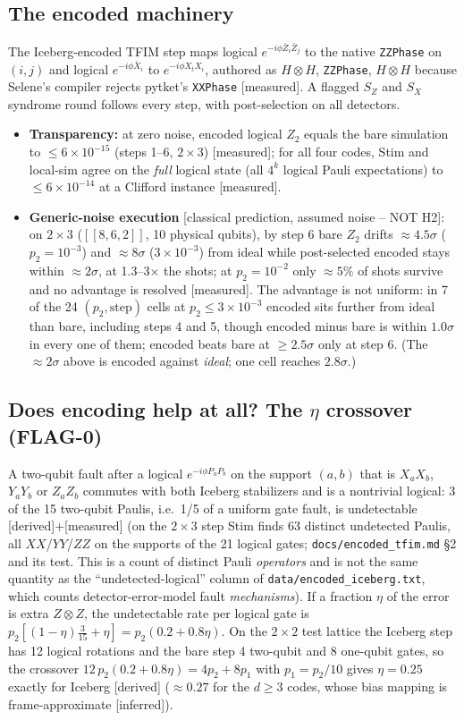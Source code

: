 \documentclass[11pt,a4paper]{article}
\newcommand{\tg}[1]{\textsf{\small[#1]}}
\newcommand{\der}{\tg{derived}}
\newcommand{\mea}{\tg{measured}}
\newcommand{\infr}{\tg{inferred}}
\newcommand{\cp}{\tg{classical prediction, assumed noise -- NOT H2}}
\newcommand{\code}[1]{\nolinkurl{#1}}
\begin{document}
\subsection{The encoded machinery}
The Iceberg-encoded TFIM step maps logical $e^{-i\phi\bar Z_i\bar Z_j}$ to the native \code{ZZPhase} on
$(i,j)$ and logical $e^{-i\phi\bar X_i}$ to $e^{-i\phi X_tX_i}$, authored as $H\otimes H$, \code{ZZPhase}, $H\otimes H$ because Selene's compiler rejects pytket's \code{XXPhase} \mea. A flagged $S_Z$ and $S_X$ syndrome
round follows every step, with post-selection on all detectors.
\begin{itemize}
\item \textbf{Transparency:} at zero noise, encoded logical $Z_2$ equals the bare simulation to $\le6\times10^{-15}$
  (steps 1--6, $2\times3$) \mea; for all four codes, Stim and local-sim agree on the \emph{full} logical state (all
  $4^k$ logical Pauli expectations) to $\le6\times10^{-14}$ at a Clifford instance \mea.
\item \textbf{Generic-noise execution} \cp: on $2\times3$ ($[[8,6,2]]$, 10 physical qubits), by step 6 bare $Z_2$
  drifts $\approx4.5\sigma$ ($p_2=10^{-3}$) and $\approx8\sigma$ ($3\times10^{-3}$) from ideal while post-selected encoded stays
  within $\approx2\sigma$, at 1.3--3$\times$ the shots; at $p_2=10^{-2}$ only $\approx5\%$ of shots survive and no
  advantage is resolved \mea. The advantage is not uniform: in 7 of the 24 $(p_2,\text{step})$ cells at
  $p_2\le3\times10^{-3}$ encoded sits further from ideal than bare, including steps 4 and 5, though
  encoded minus bare is within $1.0\sigma$ in every one of them; encoded beats bare at $\ge2.5\sigma$ only
  at step 6. (The $\approx2\sigma$ above is encoded against \emph{ideal}; one cell reaches $2.8\sigma$.)
\end{itemize}

\subsection{Does encoding help at all? The \texorpdfstring{$\eta$}{eta} crossover (FLAG-0)}\label{sec:flag0}
A two-qubit fault after a logical $e^{-i\phi P_aP_b}$ on the support $(a,b)$ that is $X_aX_b$, $Y_aY_b$ or $Z_aZ_b$
commutes with both Iceberg stabilizers and is a nontrivial logical: 3 of the 15 two-qubit Paulis, i.e.\ 1/5 of a
uniform gate fault, is undetectable \der{}+\mea{} (on the $2\times3$ step Stim finds 63 distinct undetected
Paulis, all $XX$/$YY$/$ZZ$ on the supports of the 21 logical gates; \code{docs/encoded_tfim.md} \S2 and its test.
This is a count of distinct Pauli \emph{operators} and is not the same quantity as the ``undetected-logical''
column of \code{data/encoded_iceberg.txt}, which counts detector-error-model fault \emph{mechanisms}). If a fraction $\eta$ of the error is extra $Z\otimes Z$, the undetectable rate per
logical gate is $p_2[(1-\eta)\tfrac{3}{15}+\eta]=p_2(0.2+0.8\eta)$. On the $2\times2$ test lattice the Iceberg
step has 12 logical rotations and the bare step 4 two-qubit and 8 one-qubit gates, so the crossover
$12\,p_2(0.2+0.8\eta)=4p_2+8p_1$ with $p_1=p_2/10$ gives $\eta=0.25$ exactly for Iceberg \der{}
($\approx0.27$ for the $d\ge3$ codes, whose bias mapping is frame-approximate \infr).
\end{document}
